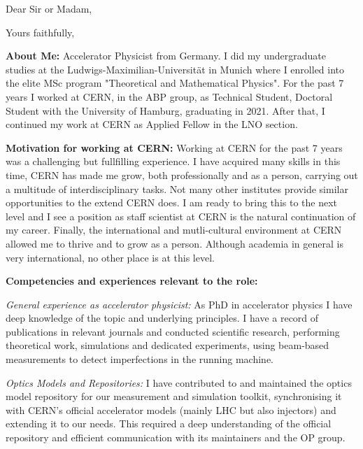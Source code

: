 \documentclass[10pt,a4paper,sans]{moderncv}        %
\begin{document}
\date{}
\opening{Dear Sir or Madam,}
\closing{Yours faithfully,}
\makelettertitle

\textbf{About Me:}
Accelerator Physicist from Germany. I did my undergraduate studies at the Ludwigs-Maximilian-Universit\"at
in Munich where I enrolled into the elite MSc program "Theoretical and Mathematical Physics". 
For the past 7 years I worked at CERN, in the ABP group, as Technical Student, Doctoral Student with the University of Hamburg,
graduating in 2021.
After that, I continued my work at CERN as Applied Fellow in the LNO section.

\textbf{Motivation for working at CERN:}
Working at CERN for the past 7 years was a challenging but fullfilling experience.
I have acquired many skills in this time, CERN has made me grow, both professionally and as a person,
carrying out a multitude of interdisciplinary tasks.
Not many other institutes provide similar opportunities to the extend CERN does.
I am ready to bring this to the next level and I see a position as staff scientist at CERN is the natural
continuation of my career.
Finally, the international and mutli-cultural environment at CERN allowed me to thrive and to grow
as a person. Although academia in general is very international, no other place is at this level.

\textbf{Competencies and experiences relevant to the role:}

    \emph{General experience as accelerator physicist:}
    As PhD in accelerator physics I have deep knowledge of the topic and underlying principles.
    I have a record of publications in relevant journals and conducted scientific research, performing
    theoretical work, simulations and dedicated experiments, using beam-based measurements to
    detect imperfections in the running machine.

    \emph{Optics Models and Repositories:}
    I have contributed to and maintained the optics model repository for our measurement and
    simulation toolkit, synchronising it with CERN's official accelerator models (mainly LHC but also injectors)
    and extending it to our needs.
    This required a deep understanding of the official repository and efficient communication with
    its maintainers and the OP group.
\end{document}
